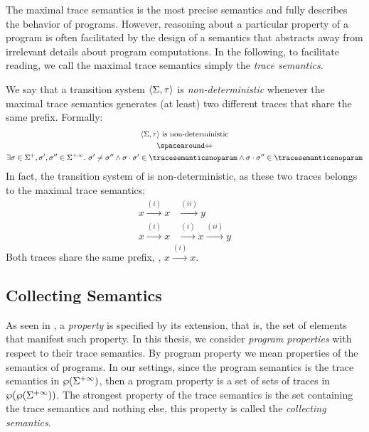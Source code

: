 The maximal trace semantics is the most precise semantics and fully describes the behavior of programs. However, reasoning about a particular property of a program is often facilitated by the design of a semantics that abstracts away from irrelevant details about program computations.
In the following, to facilitate reading, we call the maximal trace semantics simply the \emph{trace semantics}.

\begin{remark}
  We say that a transition system $\langle \Sigma, \tau \rangle$ is \emph{non-deterministic} whenever the maximal trace semantics generates (at least) two different traces that share the same prefix. Formally:
  \begin{gather*}
    \transitionsystem \text{ is non-deterministic} \\ \IfF \\ \exists \deftrace \in \finitesequences, \deftrace', \deftrace'' \in \finiteinfinitesequences.\spacer \deftrace' \neq \deftrace'' \land \concat{\deftrace}{\deftrace'} \in \tracesemanticsnoparam \land \concat{\deftrace}{\deftrace''} \in \tracesemanticsnoparam
  \end{gather*}
  In fact, the transition system of  is non-deterministic, as these two traces belongs to the maximal trace semantics:
  \begin{align*}
    x \xrightarrow{(i)} x &\xrightarrow{(ii)} y\\
    x \xrightarrow{(i)} x &\xrightarrow{(i)} x \xrightarrow{(ii)} y
  \end{align*}
  Both traces share the same prefix, \ie, $x \xrightarrow{(i)} x$.
\end{remark}

\subsection{Collecting Semantics}

As seen in , a \emph{property} is specified by its extension, that is, the set of elements that manifest such property.
In this thesis, we consider \emph{program properties} with respect to their trace semantics.
By program property we mean properties of the semantics of programs.
In our settings, since the program semantics is the trace semantics in $\wp(\Sigma^{+\infty})$, then a program property is a set of sets of traces in $\wp(\wp(\Sigma^{+\infty}))$.
The strongest property of the trace semantics is the set containing the trace semantics and nothing else, this property is called the \emph{collecting semantics}.

